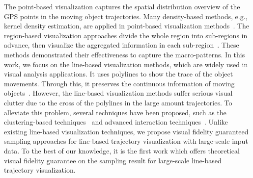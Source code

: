 The point-based visualization captures the spatial distribution overview of the GPS points in the moving object trajectories.
Many density-based methods, e.g., kernel density estimation, are applied in point-based visualization methods~\cite{liu2013vait,yang2016exploring,chae2014public,xie2008kernel, borruso2008network}.
The region-based visualization approaches divide the whole region into sub-regions in advance, then visualize the aggregated information in each sub-region~\cite{guo2009flow,wood2010visualisation,von2015mobilitygraphs}.
These methods demonstrated their effectiveness to capture the macro-patterns.
In this work, we focus on the line-based visualization methods, which are widely used in visual analysis applications.
It uses polylines to show the trace of the object movements.
Through this, it preserves the continuous information of moving objects~\cite{guo2011tripvista,hurter2009fromdady}.
However, the line-based visualization methods suffer serious visual clutter due to the cross of the polylines in the large amount trajectories.
To alleviate this problem, several techniques have been proposed, such as the clustering-based techniques~\cite{ferreira2013vector, rinzivillo2008visually, von2015mobilitygraphs} and advanced interaction techniques~\cite{kruger2013trajectorylenses, ferreira2013visual}.
Unlike existing line-based visualization techniques, we propose visual fidelity  guaranteed sampling approaches for line-based trajectory visualization with large-scale input data.
To the best of our knowledge, it is the first work which offers theoretical visual fidelity guarantee on the sampling result for large-scale line-based trajectory visualization.

